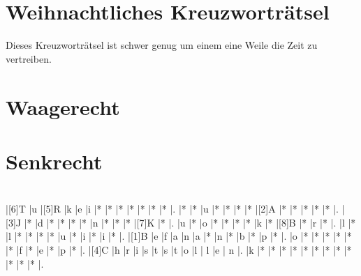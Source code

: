 \documentclass{article}
\begin{document}
\section*{Weihnachtliches Kreuzwortr\"atsel}
Dieses Kreuzwortr\"atsel ist schwer genug um einem eine Weile die Zeit zu vertreiben.
\section*{Waagerecht}
\begin{PuzzleClues}{\textbf{}}




\end{PuzzleClues}


\section*{Senkrecht}
\begin{PuzzleClues}{\textbf{}}




	

\end{PuzzleClues}

\section*{}

\begin{Puzzle}{9}{13}
	|[6]T	|u	|[5]R	|k	|e	|i	|*	|*	|*	|*	|*	|*	|*	|.
	|*	|*	|u	|*	|*	|*	|*	|[2]A	|*	|*	|*	|*	|*	|.
	|[3]J	|*	|d	|*	|*	|*	|*	|n	|*	|*	|*	|[7]K	|*	|.
	|u	|*	|o	|*	|*	|*	|*	|k	|*	|[8]B	|*	|r	|*	|.
	|l	|*	|l	|*	|*	|*	|*	|u	|*	|i	|*	|i	|*	|.
	|[1]B	|e	|f	|a	|n	|a	|*	|n	|*	|b	|*	|p	|*	|.
	|o	|*	|*	|*	|*	|*	|*	|f	|*	|e	|*	|p	|*	|.
	|[4]C	|h	|r	|i	|s	|t	|s	|t	|o	|l	| l       |e        | n      |.
	|k	|*	|*	|*	|*	|*	|*	|*	|*	|*	|*	|*	|*	|.
\end{Puzzle}
\end{document}
